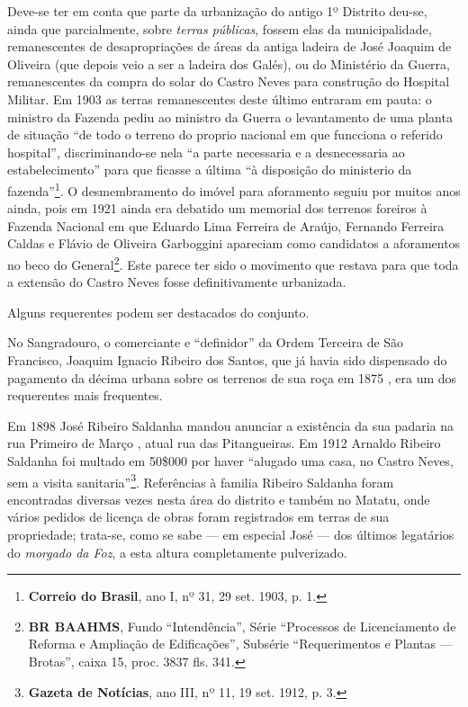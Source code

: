 Deve-se ter em conta que parte da urbanização do antigo 1º Distrito deu-se, ainda que parcialmente, sobre \textit{terras públicas}, fossem elas da municipalidade, remanescentes de desapropriações de áreas da antiga ladeira de José Joaquim de Oliveira (que depois veio a ser a ladeira dos Galés), ou do Ministério da Guerra, remanescentes da compra do solar do Castro Neves para construção do Hospital Militar. Em 1903 as terras remanescentes deste último entraram em pauta: o ministro da Fazenda pediu ao ministro da Guerra o levantamento de uma planta de situação ``de todo o terreno do proprio nacional em que funcciona o referido hospital'', discriminando-se nela ``a parte necessaria e a desnecessaria ao estabelecimento'' para que ficasse a última ``à disposição do ministerio da fazenda''\footnote{\textbf{Correio do Brasil}, ano I, nº 31, 29 set. 1903, p. 1.}. O desmembramento do imóvel para aforamento seguiu por muitos anos ainda, pois em 1921 ainda era debatido um memorial dos terrenos foreiros à Fazenda Nacional em que Eduardo Lima Ferreira de Araújo, Fernando Ferreira Caldas e Flávio de Oliveira Garboggini apareciam como candidatos a aforamentos no beco do General\footnote{\textbf{BR BAAHMS}, Fundo ``Intendência'', Série ``Processos de Licenciamento de Reforma e Ampliação de Edificações'', Subsérie ``Requerimentos e Plantas --- Brotas'', caixa 15, proc. 3837 fls. 341.}. Este parece ter sido o movimento que restava para que toda a extensão do Castro Neves fosse definitivamente urbanizada.

Alguns requerentes podem ser destacados do conjunto.


No Sangradouro, o comerciante e ``definidor'' da Ordem Terceira de São Francisco, Joaquim Ignacio Ribeiro dos Santos, que já havia sido dispensado do pagamento da décima urbana sobre os terrenos de sua roça em 1875 \cite[p.~226]{bahia_assembleia_1875}, era um dos requerentes mais frequentes.

Em 1898 José Ribeiro Saldanha mandou anunciar a existência da sua padaria na rua Primeiro de Março \cite[p.~436]{reis_almanak_1898}, atual rua das Pitangueiras. Em 1912 Arnaldo Ribeiro Saldanha foi multado em 50\$000 por haver ``alugado uma casa, no Castro Neves, sem a visita sanitaria''\footnote{\textbf{Gazeta de Notícias}, ano III, nº 11, 19 set. 1912, p. 3.}. Referências à familia Ribeiro Saldanha foram encontradas diversas vezes nesta área do distrito e também no Matatu, onde vários pedidos de licença de obras foram registrados em terras de sua propriedade; trata-se, como se sabe --- em especial José --- dos últimos legatários do \textit{morgado da Foz}, a esta altura completamente pulverizado.

